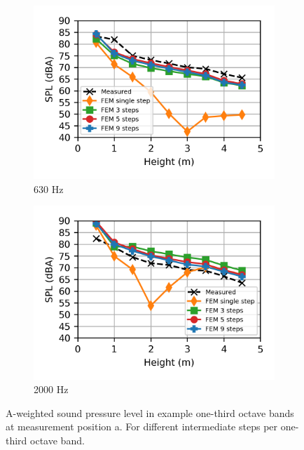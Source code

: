 \begin{figure}
\begin{subfigure}[b]{0.49\textwidth}
		\includegraphics{fig/chap5/freq_steps/third_octave_over_height/630_Hz.png}
		\caption{630 Hz}
	\end{subfigure}
	\hfill
	\begin{subfigure}[b]{0.49\textwidth}
		\centering
		\includegraphics{fig/chap5/freq_steps/third_octave_over_height/2000_Hz.png}
		\caption{2000 Hz}
		\label{fig:curve_sink}
	\end{subfigure}
	
	\caption{A-weighted sound pressure level in example one-third octave bands at measurement position a. For different intermediate steps per one-third octave band.}
	
	\label{fig:third_octave_over_height_freq_steps}
\end{figure}

